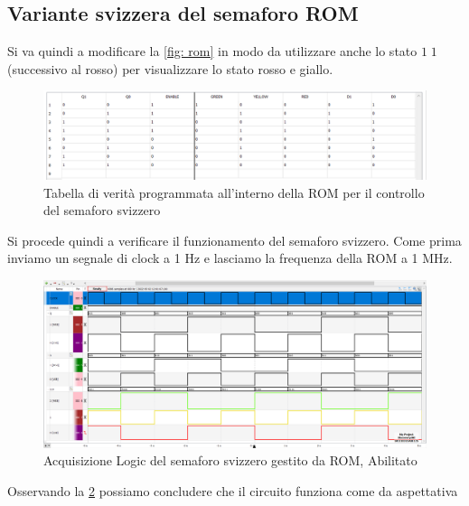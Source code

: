 \documentclass[10pt, a4paper, italian]{article}
\begin{document}
\subsection{Variante svizzera del semaforo ROM}
Si va quindi a modificare la \cref{fig: rom} in modo da utilizzare anche lo stato $1\;1$ (successivo al rosso) per visualizzare lo stato rosso e giallo.
\begin{figure}[htbp]
    \centering
    \includegraphics[width=\textwidth]{ROM.svizzero}
    \caption{Tabella di verità programmata all'interno della ROM per il controllo del semaforo svizzero
    \label{fig: rom.svizzero}}
\end{figure}
Si procede quindi a verificare il funzionamento del semaforo svizzero. Come prima inviamo un segnale di clock a 1 Hz e lasciamo la frequenza della ROM a 1 MHz.
\begin{figure}[htbp]
    \centering
    \includegraphics[width=\textwidth]{es2.svizzero}
    \caption{Acquisizione Logic del semaforo svizzero gestito da ROM, Abilitato
    \label{fig: es.2_svizzero}}
\end{figure}
Osservando la \cref{fig: es.2_svizzero} possiamo concludere che il circuito funziona come da aspettativa
\end{document}

